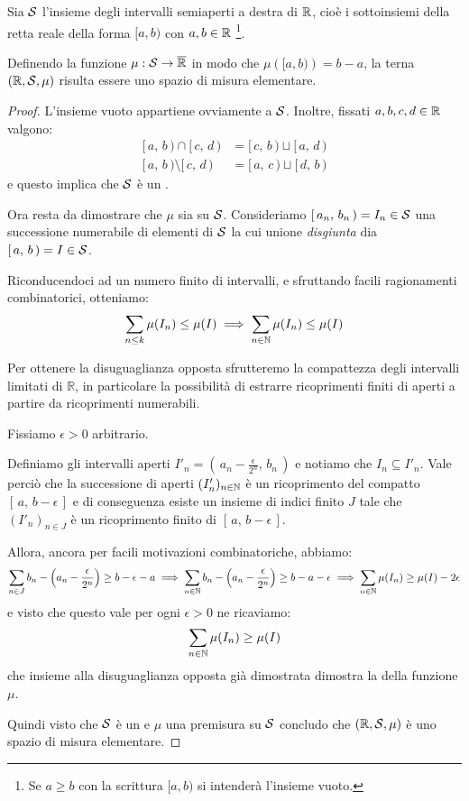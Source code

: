 \begin{theorem}
	Sia $\S$ l'insieme degli intervalli semiaperti a destra di $\R$, cioè i sottoinsiemi della retta reale della forma $[a,b)$ con $a,b\in\R$ \footnote{Se $a\ge b$ con la scrittura $[a,b)$ si intenderà l'insieme vuoto.}.
	
	Definendo la funzione $\mu:\S\to\Rbar$ in modo che $\mu\left([a,b)\right)=b-a$, la terna $(\R,\S,\mu)$ risulta essere uno spazio di misura elementare.
\end{theorem}
\begin{proof}
	\newcommand{\so}[2]{\ensuremath{[\,#1,\,#2\,)}}
	\newcommand{\oo}[2]{\ensuremath{(\,#1,\,#2\,)}}
	\newcommand{\cc}[2]{\ensuremath{[\,#1,\,#2\,]}}
	L'insieme vuoto appartiene ovviamente a $\S$.
	Inoltre, fissati $a,b,c,d\in\R$ valgono:
	\begin{align*}
		\so ab\cap \so cd &= \so cb\sqcup\so ad\\
		\so ab\setminus \so cd&= \so ac\sqcup \so db
	\end{align*}
	e questo implica che $\S$ è un \semiring{}.
	
	Ora resta da dimostrare che $\mu$ sia \sigadd{} su $\S$.
	Consideriamo $\so {a_n}{b_n}=I_n\in \S$ una successione numerabile di elementi di $\S$ la cui unione \emph{disgiunta} dia $\so ab=I\in \S$.
	
	Riconducendoci ad un numero finito di intervalli, e sfruttando facili ragionamenti combinatorici, otteniamo:
	\begin{equation*}
		\sum_{n\le k} \mu(I_n)\le \mu(I) \implies \sum_{n\in\N}\mu(I_n)\le \mu(I)
	\end{equation*}
	
	Per ottenere la disuguaglianza opposta sfrutteremo la compattezza degli intervalli limitati di $\mathbb R$, in particolare la possibilità di estrarre ricoprimenti finiti di aperti a partire da ricoprimenti numerabili.
	
	Fissiamo $\epsilon>0$ arbitrario.
	
	Definiamo gli intervalli aperti $I'_n=\oo{a_n-\frac\epsilon{2^n}}{b_n}$ e notiamo che $I_n\subseteq I'_n$.
	Vale perciò che la successione di aperti $(I'_n)_{n\in\N}$ è un ricoprimento del compatto $\cc a{b-\epsilon}$ e di conseguenza esiste un insieme di indici finito $J$ tale che $(I'_n)_{n\in J}$ è un ricoprimento finito di $\cc a{b-\epsilon}$.
	
	Allora, ancora per facili motivazioni combinatoriche, abbiamo:
	\begin{equation*}
		\sum_{n\in J} b_n-\left(a_n-\frac\epsilon{2^n}\right)\ge b-\epsilon-a\implies
		\sum_{n\in\N} b_n-\left(a_n-\frac\epsilon{2^n}\right)\ge b-a-\epsilon \implies
		\sum_{n\in\N} \mu(I_n)\ge \mu(I)-2\epsilon
	\end{equation*}
	e visto che questo vale per ogni $\epsilon>0$ ne ricaviamo:
	\begin{equation*}
		\sum_{n\in\N}\mu(I_n)\ge \mu(I)
	\end{equation*}
	che insieme alla disuguaglianza opposta già dimostrata dimostra la \sigadd[ità] della funzione $\mu$.
	
	Quindi visto che $\S$ è un \semiring{} e $\mu$ una premisura su $\S$ concludo che $(\R,\S,\mu)$ è uno spazio di misura elementare.
\end{proof}